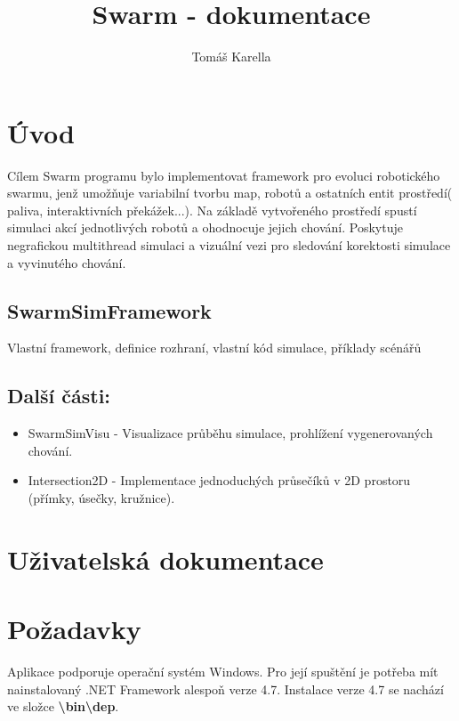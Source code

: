 \documentclass[12pt, oneside]{article}
\title{\vspace{-12ex}Swarm - dokumentace}
\author{\vspace{-10ex}Tomáš Karella}
\date{}
\begin{document}
	\maketitle
\clearpage
\tableofcontents
\clearpage
\section{Úvod}
Cílem Swarm programu bylo implementovat framework pro evoluci robotického swarmu, jenž umožňuje variabilní tvorbu map, robotů a ostatních entit prostředí( paliva, interaktivních překážek...). Na základě vytvořeného prostředí spustí simulaci akcí jednotlivých robotů a ohodnocuje jejich chování. Poskytuje negrafickou multithread simulaci a vizuální vezi pro sledování korektosti simulace a vyvinutého chování. 
\subsection{SwarmSimFramework} 
Vlastní framework, definice rozhraní, vlastní kód simulace, příklady scénářů
\subsection{Další části:}
\begin{itemize}
	\item SwarmSimVisu - 
	Visualizace průběhu simulace, prohlížení vygenerovaných chování. 
	\item Intersection2D - 
	Implementace jednoduchých průsečíků v 2D prostoru (přímky, úsečky, kružnice).
\end{itemize}
\clearpage
\section{Uživatelská dokumentace}
\section{Požadavky}
Aplikace podporuje operační systém Windows. Pro její spuštění je potřeba mít nainstalovaný .NET Framework alespoň verze 4.7. Instalace verze 4.7 se nachází ve složce \textbf{\textbackslash bin\textbackslash dep}.  
\end{document}
